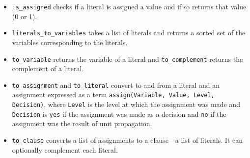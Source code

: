 \documentclass[11pt]{report}
\newcommand*{\p}[1]{\textup{\texttt{#1}}}
\begin{document}
\begin{itemize}

\item \p{is\_assigned} checks if a literal is assigned a value
and if so returns that value (0 or 1).

\item \p{literals\_to\_variables} takes a list of literals and returns a
sorted set of the variables corresponding to the literals.

\item \p{to\_variable} returns the variable of a literal and
\p{to\_complement} returns the complement of a literal.

\item \p{to\_assignment} and \p{to\_literal} convert to and from a
literal and an assignment expressed as a term \p{assign(Variable, Value,
Level, Decision)}, where \p{Level} is the level at which the assignment
was made and \p{Decision} is \p{yes} if the assignment was
made as a decision and \p{no} if the assignment was the result of unit
propagation.

\item \p{to\_clause} converts a list of assignments to a clause---a list
of literals. It can optionally complement each literal.

\end{itemize}




\end{document}
